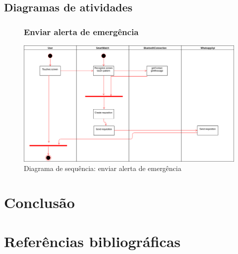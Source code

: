 \documentclass[
	12pt,				%
	openright,			%
	twoside,			%
	a4paper,			%
	english,			%
	french,				%
	spanish,			%
	brazil				%
]{abntex2}
\begin{document}
\section{Diagramas de atividades}
\begin{figure}[h]
	\subsection{Enviar alerta de emergência}
	\label{figure_diagrama_sequencia_enviar_alerta_emergencia}
	\caption{ Diagrama de sequência: enviar alerta de emergência }
	\includegraphics[scale=0.4]{ActivityDiagrams/Send_Message.png}
	\hfill
\end{figure}

\chapter{Conclusão}

\postextual

\chapter{Referências bibliográficas}

%
%
\end{document}
